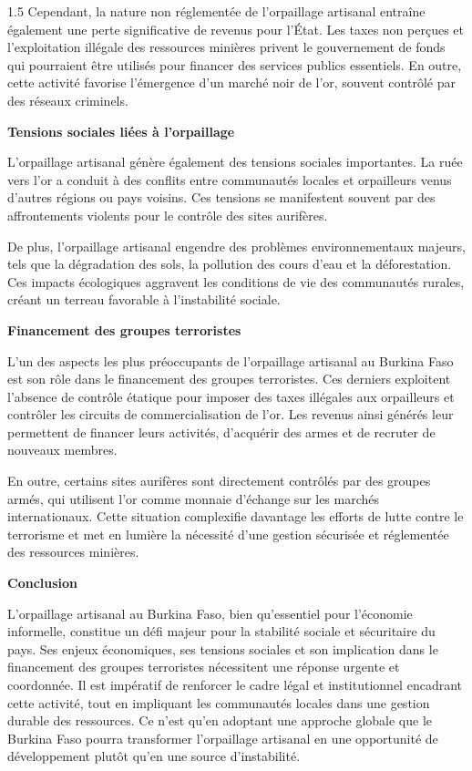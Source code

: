 \documentclass[12pt]{article}
\begin{document}
\begin{spacing}{1.5}
Cependant, la nature non réglementée de l'orpaillage artisanal entraîne également une perte significative de revenus pour l'État. Les taxes non perçues et l'exploitation illégale des ressources minières privent le gouvernement de fonds qui pourraient être utilisés pour financer des services publics essentiels. En outre, cette activité favorise l'émergence d'un marché noir de l'or, souvent contrôlé par des réseaux criminels.

\quad

\textbf{Tensions sociales liées à l'orpaillage}

L'orpaillage artisanal génère également des tensions sociales importantes. La ruée vers l'or a conduit à des conflits entre communautés locales et orpailleurs venus d'autres régions ou pays voisins. Ces tensions se manifestent souvent par des affrontements violents pour le contrôle des sites aurifères.

De plus, l'orpaillage artisanal engendre des problèmes environnementaux majeurs, tels que la dégradation des sols, la pollution des cours d'eau et la déforestation. Ces impacts écologiques aggravent les conditions de vie des communautés rurales, créant un terreau favorable à l'instabilité sociale.

\quad

\textbf{Financement des groupes terroristes}

L'un des aspects les plus préoccupants de l'orpaillage artisanal au Burkina Faso est son rôle dans le financement des groupes terroristes. Ces derniers exploitent l'absence de contrôle étatique pour imposer des taxes illégales aux orpailleurs et contrôler les circuits de commercialisation de l'or. Les revenus ainsi générés leur permettent de financer leurs activités, d'acquérir des armes et de recruter de nouveaux membres.

En outre, certains sites aurifères sont directement contrôlés par des groupes armés, qui utilisent l'or comme monnaie d'échange sur les marchés internationaux. Cette situation complexifie davantage les efforts de lutte contre le terrorisme et met en lumière la nécessité d'une gestion sécurisée et réglementée des ressources minières.

\quad

\textbf{Conclusion}

L'orpaillage artisanal au Burkina Faso, bien qu'essentiel pour l'économie informelle, constitue un défi majeur pour la stabilité sociale et sécuritaire du pays. Ses enjeux économiques, ses tensions sociales et son implication dans le financement des groupes terroristes nécessitent une réponse urgente et coordonnée. Il est impératif de renforcer le cadre légal et institutionnel encadrant cette activité, tout en impliquant les communautés locales dans une gestion durable des ressources. Ce n'est qu'en adoptant une approche globale que le Burkina Faso pourra transformer l'orpaillage artisanal en une opportunité de développement plutôt qu'en une source d'instabilité.









\end{spacing}
\end{document}
